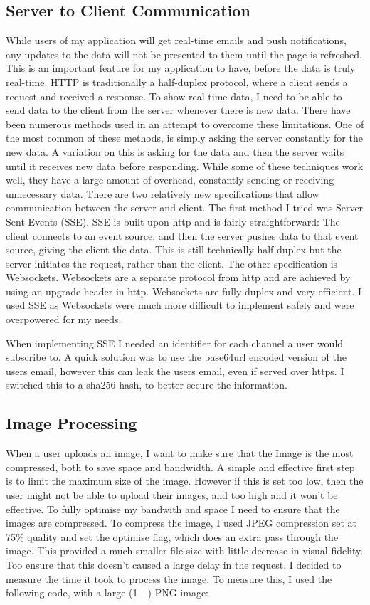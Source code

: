 \documentclass[a4paper,oneside,12pt]{report}
\begin{document}
	\subsection{Server to Client Communication}
	While users of my application will get real-time emails and push notifications, any updates to the data will not be presented to them until the page is refreshed. This is an important feature for my application to have, before the data is truly real-time. HTTP is traditionally a half-duplex protocol, where a client sends a request and received a response. To show real time data, I need to be able to send data to the client from the server whenever there is new data. There have been numerous methods used in an attempt to overcome these limitations. One of the most common of these methods, is simply asking the server constantly for the new data. A variation on this is asking for the data and then the server waits until it receives new data before responding. While some of these techniques work well, they have a large amount of overhead, constantly sending or receiving unnecessary data. There are two relatively new specifications that allow communication between the server and client. The first method I tried was Server Sent Events (SSE). SSE is built upon http and is fairly straightforward: The client connects to an event source, and then the server pushes data to that event source, giving the client the data. This is still technically half-duplex but the server initiates the request, rather than the client. The other specification is Websockets. Websockets are a separate protocol from http and are achieved by using an upgrade header in http. Websockets are fully duplex and very efficient. I used SSE as Websockets were much more difficult to implement safely and were overpowered for my needs.

	When implementing SSE I needed an identifier for each channel a user would subscribe to. A quick solution was to use the base64url encoded version of the users email, however this can leak the users email, even if served over https. I switched this to a sha256 hash, to better secure the information.

	\subsection{Image Processing}
	When a user uploads an image, I want to make sure that the Image is the most compressed, both to save space and bandwidth.
	A simple and effective first step is to limit the maximum size of the image. However if this is set too low, then the user might not be able to upload their images, and too high and it won't be effective. To fully optimise my bandwith and space I need to ensure that the images are compressed. To compress the image, I used JPEG compression set at 75\% quality and set the optimise flag, which does an extra pass through the image. This provided a much smaller file size with little decrease in visual fidelity. Too ensure that this doesn't caused a large delay in the request, I decided to measure the time it took to process the image. To measure this, I used the following code, with a large (\SI{1}{\mega\byte}) PNG image:
\end{document}
